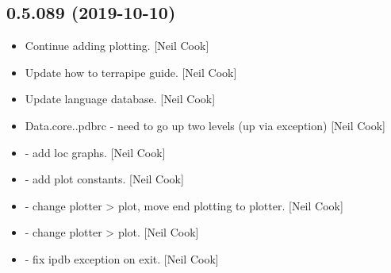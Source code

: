 \documentclass[a4paper,10pt,english]{report}
\begin{document}
\subsection{0.5.089 (2019-10-10)}
\label{\detokenize{misc/changelog:id53}}\begin{itemize}
\item {} 
Continue adding plotting. {[}Neil Cook{]}

\item {} 
Update how to terrapipe guide. {[}Neil Cook{]}

\item {} 
Update language database. {[}Neil Cook{]}

\item {} 
Data.core..pdbrc - need to go up two levels (up via exception) {[}Neil
Cook{]}

\item {} 
 - add loc graphs. {[}Neil
Cook{]}

\item {} 
 - add plot constants. {[}Neil
Cook{]}

\item {} 
 - change plotter \textendash{}\textgreater{} plot, move end plotting
to plotter. {[}Neil Cook{]}

\item {} 
 - change plotter \textendash{}\textgreater{} plot. {[}Neil Cook{]}

\item {} 
 - fix ipdb exception on exit. {[}Neil
Cook{]}

\end{itemize}
\end{document}
